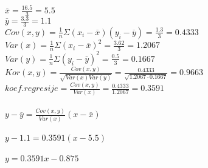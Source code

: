 \documentclass{article}%
\begin{document}
%
\normalsize%
\renewcommand{\arraystretch}{2}%
\\%
\\[1em]%
\Large $\overline{x}=\frac{16.5}{3}=5.5$%
\\[1em]%
\Large $\overline{y}=\frac{3.3}{3}=1.1$%
\\[1em]%
\Large $Cov(x,y)=\frac{1}{n}\Sigma(x_i-\overline{x})(y_i-\overline{y})=\frac{1.3}{3}=0.4333$%
\\[1em]%
\Large $Var(x)=\frac{1}{n}\Sigma{(x_i-\overline{x})}^2=\frac{3.62}{3}=1.2067$%
\\[1em]%
\Large $Var(y)=\frac{1}{n}\Sigma{(y_i-\overline{y})}^2=\frac{0.5}{3}=0.1667$%
\\[1em]%
\Large $Kor(x,y)=\frac{Cov(x,y)}{\sqrt{Var(x)Var(y)}}=\frac{0.4333}{\sqrt{1.2067 \cdot 0.1667}}=0.9663$%
\\[1em]%
\Large $koef. regresije=\frac{Cov(x,y)}{Var(x)}=\frac{0.4333}{1.2067}=0.3591$%
\\[1em]%
\Large {}\\%
$y-\overline{y}=\frac{Cov(x,y)}{Var(x)}(x-\overline{x})$\\%
\\[1em]%
$y-1.1=0.3591(x-5.5)$\\%
\\[1em]%
$y=0.3591x-0.875$%
\end{document}
